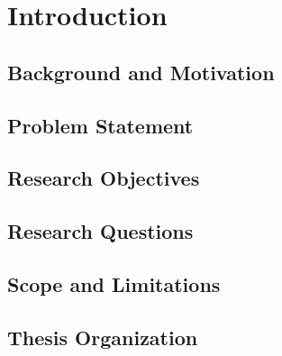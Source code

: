 \chapter{Introduction}

\section{Background and Motivation}

\section{Problem Statement}

\section{Research Objectives}

\section{Research Questions}

\section{Scope and Limitations}

\section{Thesis Organization}
